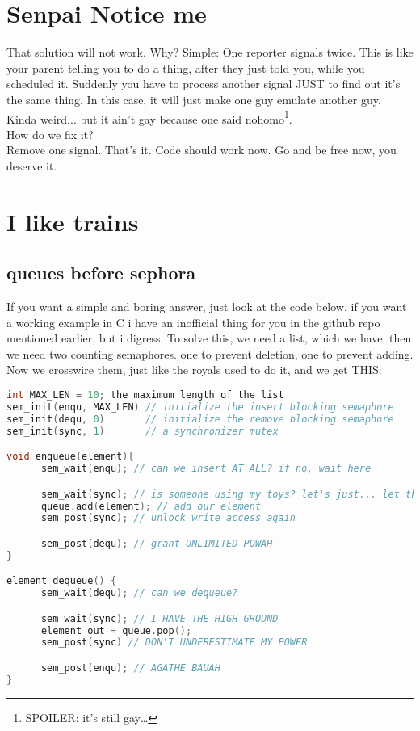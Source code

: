 \documentclass[a4paper, 11pt]{article}
\begin{document}
    \section{Senpai Notice me}
    That solution will not work. Why? Simple: One reporter signals twice.
    This is like your parent telling you to do a thing, after they just told you, while you scheduled it. 
    Suddenly you have to process another signal JUST to find out it's the same thing. 
    In this case, it will just make one guy emulate another guy. Kinda weird... but it ain't gay because one said nohomo\footnote{SPOILER: it's still gay\dots}.\\
    How do we fix it?\\
    Remove one signal. That's it. Code should work now. Go and be free now, you deserve it.
    
    \section{I like trains}
    \subsection{queues before sephora}
    If you want a simple and boring answer, just look at the code below. if you want a working example in C i have an inofficial thing for you in the github repo mentioned earlier, but i digress. 
    To solve this, we need a list, which we have. then we need two counting semaphores. one to prevent deletion, one to prevent adding.
    Now we crosswire them, just like the royals used to do it, and we get THIS:
    \begin{lstlisting}[language=c]
int MAX_LEN = 10; the maximum length of the list
sem_init(enqu, MAX_LEN) // initialize the insert blocking semaphore
sem_init(dequ, 0)       // initialize the remove blocking semaphore
sem_init(sync, 1)       // a synchronizer mutex

void enqueue(element){
      sem_wait(enqu); // can we insert AT ALL? if no, wait here

      sem_wait(sync); // is someone using my toys? let's just... let them play.. we can always clean up later
      queue.add(element); // add our element
      sem_post(sync); // unlock write access again

      sem_post(dequ); // grant UNLIMITED POWAH
}

element dequeue() {
      sem_wait(dequ); // can we dequeue?

      sem_wait(sync); // I HAVE THE HIGH GROUND
      element out = queue.pop();
      sem_post(sync) // DON'T UNDERESTIMATE MY POWER

      sem_post(enqu); // AGATHE BAUAH
}
    \end{lstlisting}
    \newpage
    
\end{document}
